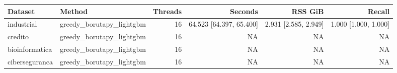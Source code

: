\begin{tabular}{llrrrr}
Dataset & Method & Threads & Seconds & RSS GiB & Recall \\
\hline
industrial & greedy\_borutapy\_lightgbm & 16 & 64.523 [64.397, 65.400] & 2.931 [2.585, 2.949] & 1.000 [1.000, 1.000] \\
credito & greedy\_borutapy\_lightgbm & 16 & NA & NA & NA \\
bioinformatica & greedy\_borutapy\_lightgbm & 16 & NA & NA & NA \\
ciberseguranca & greedy\_borutapy\_lightgbm & 16 & NA & NA & NA \\
\end{tabular}
